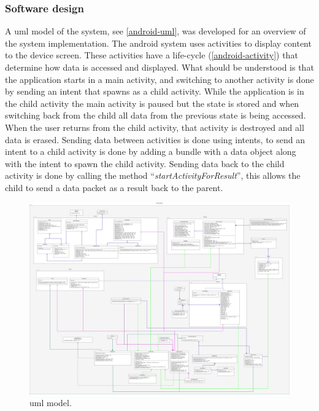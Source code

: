 \subsubsection{Software design}
A \gls{uml}\cite{uml} model of the system, see \autoref{android-uml}, was developed for an overview of the system implementation. The android system uses activities\cite{activity} to display content to the device screen. These activities have a life-cycle (\autoref{android-activity}) that determine how data is accessed and displayed. What should be understood is that the application starts in a main activity, and switching to another activity is done by sending an intent that spawns as a child activity.
While the application is in the child activity the main activity is paused but the state is stored and when switching back from the child all data from the previous state is being accessed.
When the user returns from the child activity,  that activity is destroyed and all data is erased.
Sending data between activities is done using intents, to send an intent to a child activity is done by adding a bundle with a data object along with the intent to spawn the child activity.
Sending data back to the child activity is done by calling the method ``\emph{startActivityForResult}'', this allows the child to send a data packet as a result back to the parent. 
\begin{figure}[H]%
\centering
\includegraphics[width=\textwidth]{Figures/uml.png}
\caption{\gls{uml} model.}
\label{android-uml}
\end{figure}
